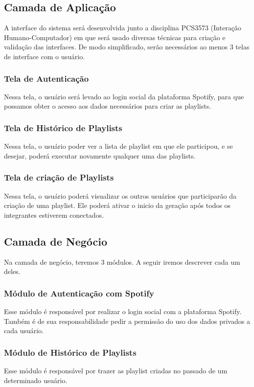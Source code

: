 \documentclass[
	12pt,				%
    oneside,			%
	a4paper,			%
	english,			%
	french,				%
	spanish,			%
	brazil,				%
	]{abntex2}
\begin{document}
\subsection{Camada de Aplicação}
A interface do sistema será desenvolvida junto a disciplina PCS3573 (Interação Humano-Computador) em que será usado diversas técnicas para criação e validação das interfaces.
De modo simplificado, serão necessários ao menos 3 telas de interface com o usuário.

\subsubsection{Tela de Autenticação}
Nessa tela, o usuário será levado ao login social da plataforma Spotify, para que possamos obter o acesso aos dados necessários para criar as playlists.

\subsubsection{Tela de Histórico de Playlists}
Nessa tela, o usuário poder ver a lista de playlist em que ele participou, e se desejar, poderá executar novamente qualquer uma das playlists.

\subsubsection{Tela de criação de Playlists}
Nessa tela, o usuário poderá visualizar os outros usuários que participarão da criação de uma playlist. Ele poderá ativar o inicio da geração após todos os integrantes estiverem conectados.

\subsection{Camada de Negócio}
Na camada de negócio, teremos 3 módulos. A seguir iremos descrever cada um deles.

\subsubsection{Módulo de Autenticação com Spotify}
Esse módulo é responsável por realizar o login social com a plataforma Spotify. Também é de sua responsabilidade pedir a permissão do uso dos dados privados a cada usuário.

\subsubsection{Módulo de Histórico de Playlists}
Esse módulo é responsável por trazer as playlist criadas no passado de um determinado usuário.
\end{document}

